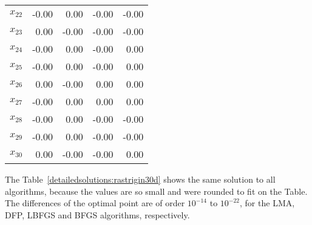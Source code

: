 \begin{table}[H]
\begin{tabular}{lrrrr}
$x_{22}$ &    -0.00 &     0.00 &    -0.00 &    -0.00 \\
$x_{23}$ &     0.00 &    -0.00 &    -0.00 &    -0.00 \\
$x_{24}$ &    -0.00 &     0.00 &    -0.00 &     0.00 \\
$x_{25}$ &    -0.00 &     0.00 &    -0.00 &     0.00 \\
$x_{26}$ &     0.00 &    -0.00 &     0.00 &     0.00 \\
$x_{27}$ &    -0.00 &     0.00 &     0.00 &     0.00 \\
$x_{28}$ &    -0.00 &     0.00 &    -0.00 &    -0.00 \\
$x_{29}$ &    -0.00 &     0.00 &    -0.00 &    -0.00 \\
$x_{30}$ &     0.00 &    -0.00 &    -0.00 &     0.00 \\
\bottomrule
\end{tabular}
\end{table}

The Table~\ref{detailedsolutions:rastrigin30d} shows the same solution to all algorithms, because the values are so small
and were rounded to fit on the Table. The differences of the optimal point are of order $10^{-14}$ to $10^{-22}$,
for the LMA, DFP, LBFGS and BFGS algorithms, respectively.

